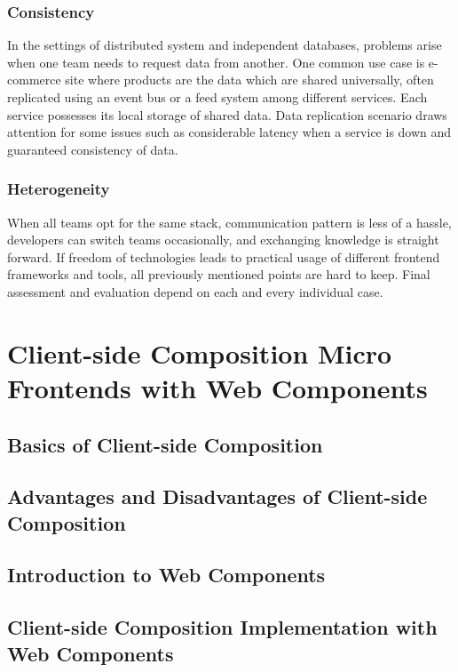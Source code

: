 \documentclass[a4paper]{book}
\begin{document}
\subsection{Consistency}
 
In the settings of distributed system and independent databases, problems arise when one team needs to request data from another. One common use case is e-commerce site where products are the data which are shared universally, often replicated using an event bus or a feed system among different services. Each service possesses its local storage of shared data. Data replication scenario draws attention for some issues such as considerable latency when a service is down and guaranteed consistency of data.

\subsection{Heterogeneity}

When all teams opt for the same stack, communication pattern is less of a hassle, developers can switch teams occasionally, and exchanging knowledge is straight forward. If freedom of technologies leads to practical usage of different frontend frameworks and tools, all previously mentioned points are hard to keep. Final assessment and evaluation depend on each and every individual case.


\chapter{Client-side Composition Micro Frontends with Web Components}
\section{Basics of Client-side Composition}
\section{Advantages and Disadvantages of Client-side Composition}
\section{Introduction to Web Components}
\section{Client-side Composition Implementation with Web Components}
\end{document}
